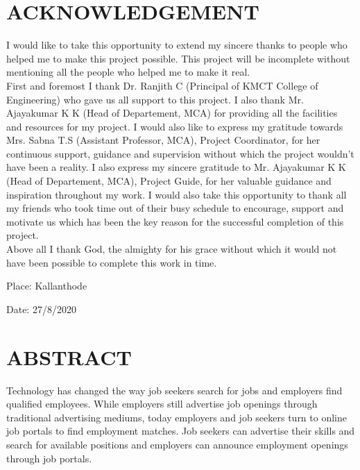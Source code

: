 \documentclass[a4paper,12pt]{report}
\begin{document}
\pagebreak

\listoffigures

\pagebreak

\listoftables

\pagebreak
\section*{\centering \bf \large ACKNOWLEDGEMENT}


\vspace*{20pt}

I would like to take this opportunity to extend my sincere thanks to people who helped me to make
this project possible. This project will be incomplete without mentioning all the people who helped
me to make it real.\\

\hspace{12pt} First and foremost I thank Dr. Ranjith C (Principal of KMCT College of Engineering) who
gave us all support to this project. I also thank Mr. Ajayakumar K K (Head of Departement,
MCA) for providing all the facilities and resources for my project. I would also like to express my
gratitude towards Mrs. Sabna T.S (Assistant Professor, MCA), Project Coordinator, for her
continuous support, guidance and supervision without which the project wouldn’t have been a
reality. I also express my sincere gratitude to Mr. Ajayakumar K K (Head of Departement,
MCA), Project
Guide, for her valuable guidance and inspiration throughout my work. I would also take this
opportunity to thank all my friends who took time out of their busy schedule to encourage, support
and motivate us which has been the key reason for the successful completion of this project.\\ 
 
Above all I thank God, the almighty for his grace without which it would not have been
possible to complete this work in time.	

\vspace*{100pt} Place: Kallanthode 

\vspace*{10pt} Date: 27/8/2020	

\pagebreak



\section*{\centering \bf \large ABSTRACT}
\vspace*{20pt}
\par
\hspace*{12pt}Technology has changed the way job seekers search for jobs and employers
find qualified employees. While employers still advertise job openings through
traditional advertising mediums, today employers and job seekers turn to online
job portals to find employment matches. Job seekers can advertise their skills and
search for available positions and employers can announce employment openings
through job portals.\\
\end{document}
